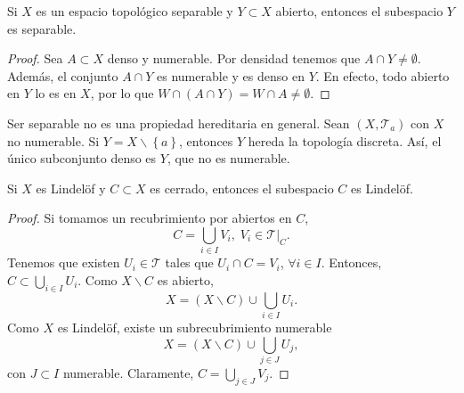 \begin{prop}
Si $\displaystyle X $ es un espacio topológico separable y $\displaystyle Y \subset X $ abierto, entonces el subespacio $\displaystyle Y $ es separable.
\end{prop}
\begin{proof}
Sea $\displaystyle A \subset X $ denso y numerable. Por densidad tenemos que $\displaystyle A \cap Y \neq \emptyset $. Además, el conjunto $\displaystyle A \cap Y $ es numerable y es denso en $\displaystyle Y $. En efecto, todo abierto en $\displaystyle Y $ lo es en $\displaystyle X $, por lo que $\displaystyle W \cap \left(A \cap Y\right)= W \cap A \neq \emptyset $.
\end{proof}
\begin{eg}
	Ser separable no es una propiedad hereditaria en general. Sean $\displaystyle \left(X, \mathcal{T}_{a}\right) $ con $\displaystyle X $ no numerable. Si $\displaystyle Y = X \backslash \left\{ a\right\}  $, entonces $\displaystyle Y $ hereda la topología discreta. Así, el único subconjunto denso es $\displaystyle Y $, que no es numerable. 
\end{eg}
\begin{prop}
Si $\displaystyle X $ es Lindelöf y $\displaystyle C \subset X $ es cerrado, entonces el subespacio $\displaystyle C $ es Lindelöf.  
\end{prop}
\begin{proof}
Si tomamos un recubrimiento por abiertos en $\displaystyle C $, 
\[C = \bigcup_{i \in I}V_{i}, \; V_{i} \in \mathcal{T}|_{C} .\]
Tenemos que existen $\displaystyle U_{i} \in \mathcal{T} $ tales que $\displaystyle U_{i} \cap C = V_{i} $, $\displaystyle \forall i \in I $. Entonces, $\displaystyle C \subset \bigcup_{i \in I}U_{i} $. Como $\displaystyle X \backslash C $ es abierto,
\[X = \left(X \backslash C\right)\cup \bigcup_{i \in I}U_{i} .\]
Como $\displaystyle X $ es Lindelöf, existe un subrecubrimiento numerable
\[X = \left(X \backslash C\right) \cup \bigcup_{j \in J}U_{j}, \]
con $\displaystyle J \subset I $ numerable. Claramente, $\displaystyle C = \bigcup_{j \in J}V_{j} $. 
\end{proof}
